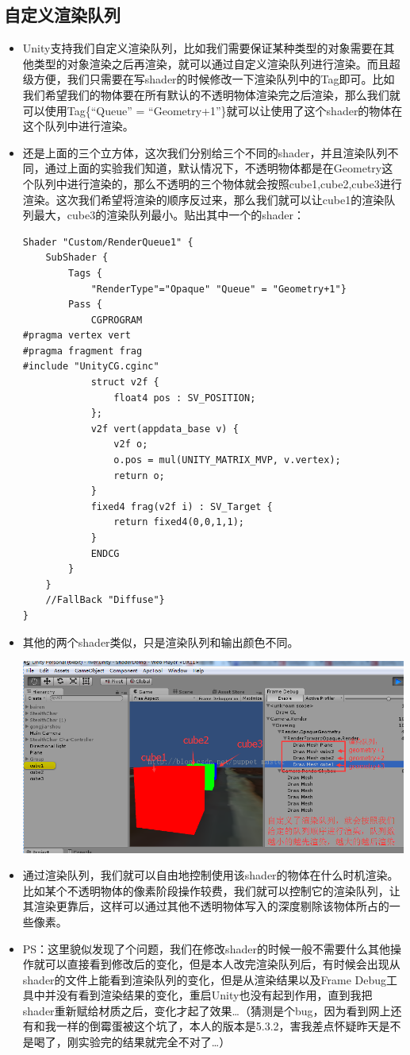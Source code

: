 \documentclass[9pt, b5paper]{article}
\begin{document}
\subsection{自定义渲染队列}
\label{sec-2-5}
\begin{itemize}
\item Unity支持我们自定义渲染队列，比如我们需要保证某种类型的对象需要在其他类型的对象渲染之后再渲染，就可以通过自定义渲染队列进行渲染。而且超级方便，我们只需要在写shader的时候修改一下渲染队列中的Tag即可。比如我们希望我们的物体要在所有默认的不透明物体渲染完之后渲染，那么我们就可以使用Tag\{“Queue” = “Geometry+1”\}就可以让使用了这个shader的物体在这个队列中进行渲染。
\item 还是上面的三个立方体，这次我们分别给三个不同的shader，并且渲染队列不同，通过上面的实验我们知道，默认情况下，不透明物体都是在Geometry这个队列中进行渲染的，那么不透明的三个物体就会按照cube1,cube2,cube3进行渲染。这次我们希望将渲染的顺序反过来，那么我们就可以让cube1的渲染队列最大，cube3的渲染队列最小。贴出其中一个的shader：
\begin{verbatim}
Shader "Custom/RenderQueue1" {
 	SubShader {
		Tags {
            "RenderType"="Opaque" "Queue" = "Geometry+1"}
        Pass {
			CGPROGRAM
#pragma vertex vert
#pragma fragment frag
#include "UnityCG.cginc"
            struct v2f {
				float4 pos : SV_POSITION;
            };
            v2f vert(appdata_base v) {
				v2f o;
                o.pos = mul(UNITY_MATRIX_MVP, v.vertex);
                return o;
            }
            fixed4 frag(v2f i) : SV_Target {
				return fixed4(0,0,1,1);
            }
            ENDCG
        }
    }
    //FallBack "Diffuse"}
}
\end{verbatim}
\item 其他的两个shader类似，只是渲染队列和输出颜色不同。

\includegraphics[width=.9\linewidth]{./pic/renderQueue3.png}
\item 通过渲染队列，我们就可以自由地控制使用该shader的物体在什么时机渲染。比如某个不透明物体的像素阶段操作较费，我们就可以控制它的渲染队列，让其渲染更靠后，这样可以通过其他不透明物体写入的深度剔除该物体所占的一些像素。
\item PS：这里貌似发现了个问题，我们在修改shader的时候一般不需要什么其他操作就可以直接看到修改后的变化，但是本人改完渲染队列后，有时候会出现从shader的文件上能看到渲染队列的变化，但是从渲染结果以及Frame Debug工具中并没有看到渲染结果的变化，重启Unity也没有起到作用，直到我把shader重新赋给材质之后，变化才起了效果\ldots{}（猜测是个bug，因为看到网上还有和我一样的倒霉蛋被这个坑了，本人的版本是5.3.2，害我差点怀疑昨天是不是喝了，刚实验完的结果就完全不对了\ldots{}）
\end{itemize}
\end{document}
